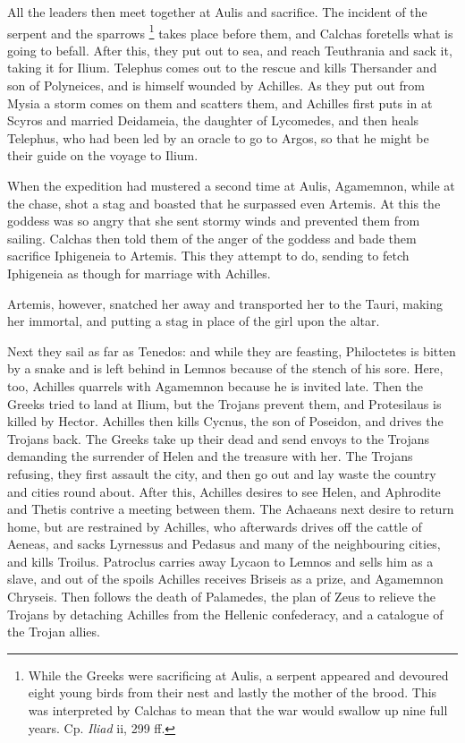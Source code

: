 All the leaders then meet together at Aulis and sacrifice. The incident of the
serpent and the sparrows \footnote{While the Greeks were
sacrificing at Aulis, a serpent appeared and devoured eight young birds from
their nest and lastly the mother of the brood. This was interpreted by Calchas
to mean that the war would swallow up nine full years. Cp. \emph{Iliad}
ii, 299 ff.} takes place before them, and
Calchas foretells what is going to befall. After this, they put out to sea, and
reach Teuthrania and sack it, taking it for Ilium. Telephus comes out to the
rescue and kills Thersander and son of Polyneices, and is himself wounded by
Achilles. As they put out from Mysia a storm comes on them and scatters them,
and Achilles first puts in at Scyros and married Deidameia, the daughter of
Lycomedes, and then heals Telephus, who had been led by an oracle to go to
Argos, so that he might be their guide on the voyage to Ilium.

When the expedition had mustered a second time at Aulis, Agamemnon, while at
the chase, shot a stag and boasted that he surpassed even Artemis. At this the
goddess was so angry that she sent stormy winds and prevented them from
sailing. Calchas then told them of the anger of the goddess and bade them
sacrifice Iphigeneia to Artemis. This they attempt to do, sending to fetch
Iphigeneia as though for marriage with Achilles.

Artemis, however, snatched her away and transported her to the Tauri, making
her immortal, and putting a stag in place of the girl upon the altar.

Next they sail as far as Tenedos: and while they are feasting, Philoctetes is
bitten by a snake and is left behind in Lemnos because of the stench of his
sore. Here, too, Achilles quarrels with Agamemnon because he is invited late.
Then the Greeks tried to land at Ilium, but the Trojans prevent them, and
Protesilaus is killed by Hector. Achilles then kills Cycnus, the son of
Poseidon, and drives the Trojans back. The Greeks take up their dead and send
envoys to the Trojans demanding the surrender of Helen and the treasure with
her. The Trojans refusing, they first assault the city, and then go out and lay
waste the country and cities round about. After this, Achilles desires to see
Helen, and Aphrodite and Thetis contrive a meeting between them. The Achaeans
next desire to return home, but are restrained by Achilles, who afterwards
drives off the cattle of Aeneas, and sacks Lyrnessus and Pedasus and many of
the neighbouring cities, and kills Troilus. Patroclus carries away Lycaon to
Lemnos and sells him as a slave, and out of the spoils Achilles receives
Briseis as a prize, and Agamemnon Chryseis. Then follows the death of
Palamedes, the plan of Zeus to relieve the Trojans by detaching Achilles from
the Hellenic confederacy, and a catalogue of the Trojan allies.

